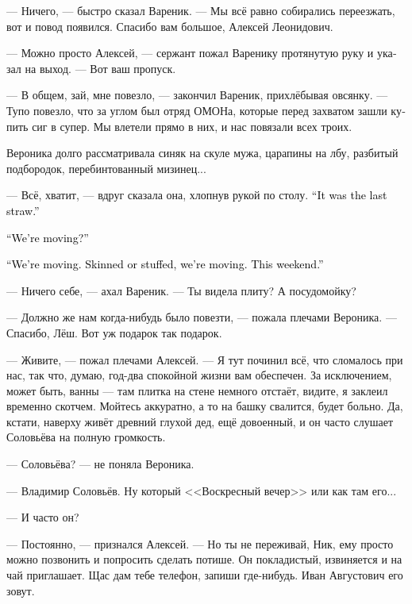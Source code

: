 \documentclass[a5paper,12pt,fleqn]{extbook}\usepackage{cooltooltips}\usepackage{polyglossia}\setdefaultlanguage[babelshorthands=true]{russian}\setotherlanguage{english}\defaultfontfeatures{Ligatures=TeX,Mapping=tex-text} \usepackage{xcolor}\definecolor{lightgray}{HTML}{bbbbbb}\color{lightgray}\newcommand{\ml}[3]{\textenglish{\textcolor{black}{#3}}}
\newcommand{\asterism}{\vspace{1em}{\centering\Large\bfseries$\ast~\ast~\ast$\par}\vspace{1em}}
\newcommand{\textspace}{\vspace{1em}{\centering\Large\bfseries<...>\par}\vspace{1em}}
\begin{document}
--- Ничего, --- быстро сказал Вареник.
--- Мы всё равно собирались переезжать, вот и повод появился.
Спасибо вам большое, Алексей Леонидович.

--- Можно просто Алексей, --- сержант пожал Варенику протянутую руку и указал на выход.
--- Вот ваш пропуск.

\asterism

\textspace

--- В общем, зай, мне повезло, --- закончил Вареник, прихлёбывая овсянку.
--- Тупо повезло, что за углом был отряд ОМОНа, которые перед захватом зашли купить сиг в супер.
Мы влетели прямо в них, и нас повязали всех троих.

Вероника долго рассматривала синяк на скуле мужа, царапины на лбу, разбитый подбородок, перебинтованный мизинец...

--- Всё, хватит, --- вдруг сказала она, хлопнув рукой по столу.
\ml{$0$}
{--- Это была последняя капля.}
{``It was the last straw.''}

\ml{$0$}
{--- Переезжаем?}
{``We're moving?''}

\ml{$0$}
{--- Переезжаем.}
{``We're moving.}
\ml{$0$}
{Переезжаем хоть тушкой, хоть чучелком.}
{Skinned or stuffed, we're moving.}
\ml{$0$}
{На этих выходных.}
{This weekend.''}

\asterism

\textspace

--- Ничего себе, --- ахал Вареник.
--- Ты видела плиту?
А посудомойку?

--- Должно же нам когда-нибудь было повезти, --- пожала плечами Вероника.
--- Спасибо, Лёш.
Вот уж подарок так подарок.

--- Живите, --- пожал плечами Алексей.
--- Я тут починил всё, что сломалось при нас, так что, думаю, год-два спокойной жизни вам обеспечен.
За исключением, может быть, ванны --- там плитка на стене немного отстаёт, видите, я заклеил временно скотчем.
Мойтесь аккуратно, а то на башку свалится, будет больно.
Да, кстати, наверху живёт древний глухой дед, ещё довоенный, и он часто слушает Соловьёва на полную громкость.

--- Соловьёва? --- не поняла Вероника.

--- Владимир Соловьёв.
Ну который <<Воскресный вечер>> или как там его...

--- И часто он?

--- Постоянно, --- признался Алексей.
--- Но ты не переживай, Ник, ему просто можно позвонить и попросить сделать потише.
Он покладистый, извиняется и на чай приглашает.
Щас дам тебе телефон, запиши где-нибудь.
Иван Августович его зовут.
\end{document}
